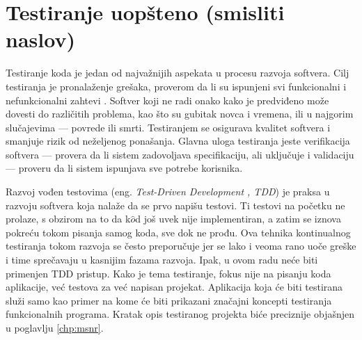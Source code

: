 \documentclass[12pt,oneside]{memoir}
\begin{document}
\section{Testiranje uopšteno (smisliti naslov)}
\label{sec:piramid}

\par Testiranje koda je jedan od najvažnijih aspekata u procesu razvoja softvera. Cilj testiranja je pronalaženje grešaka, proverom da li su ispunjeni svi funkcionalni i nefunkcionalni zahtevi \cite{test}.  Softver koji ne radi onako kako je predviđeno može dovesti do različitih problema, kao što su gubitak novca i vremena, ili u najgorim slučajevima --- povrede ili smrti. Testiranjem se osigurava kvalitet softvera i smanjuje rizik od neželjenog ponašanja. Glavna uloga testiranja jeste verifikacija softvera --- provera da li sistem zadovoljava specifikaciju, ali uključuje i validaciju --- proveru da li sistem ispunjava sve potrebe korisnika.  
\par Razvoj vođen testovima (eng. \emph{Test-Driven Development , TDD}) je praksa u razvoju softvera koja nalaže da se prvo napišu testovi. Ti testovi na početku ne prolaze, s obzirom na to da k$\hat{o}$d još uvek nije implementiran, a zatim se iznova pokreću tokom pisanja samog koda, sve dok ne prođu. Ova tehnika kontinualnog testiranja tokom razvoja se često preporučuje jer se lako i veoma rano uoče greške i time sprečavaju u kasnijim fazama razvoja. Ipak, u ovom radu neće biti primenjen TDD pristup. Kako je tema testiranje, fokus nije na pisanju koda aplikacije, već testova za već napisan projekat. Aplikacija koja će biti testirana služi samo kao primer na kome će biti prikazani značajni koncepti testiranja funkcionalnih programa. Kratak opis testiranog projekta biće preciznije objašnjen u poglavlju \ref{chp:msnr}. 
\end{document}
